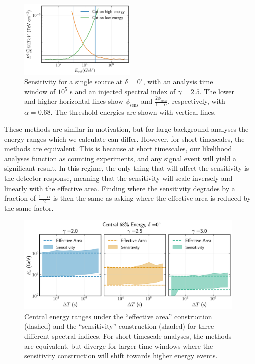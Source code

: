 \documentclass[a4paper,11pt]{article}
\begin{document}
\begin{figure}
    \centering
    \includegraphics[width=0.5\textwidth]{figures/sensitivity_en_range_gfu.png}
    \caption{Sensitivity for a single source at $\delta=0^{\circ}$, with an analysis time window of $10^5$ s and an injected spectral index of $\gamma=2.5$. The lower and higher horizontal lines show $\phi_{\mathrm{sens}}$ and  $\frac{2\phi_{\mathrm{sens}}}{1+\alpha}$, respectively, with $\alpha=0.68$. The threshold energies are shown with vertical lines.}
    \label{fig:central_en_sensitivity_gfu}
\end{figure}

These methods are similar in motivation, but for large background analyses the energy ranges which we calculate can differ. However, for short timescales, the methods are equivalent. This is because at short timescales, our likelihood analyses function as counting experiments, and any signal event will yield a significant result. In this regime, the only thing that will affect the sensitivity is the detector response, meaning that the sensitivity will scale inversely and linearly with the effective area. Finding where the sensitivity degrades by a fraction of $\frac{1-\alpha}{2}$ is then the same as asking where the effective area is reduced by the same factor.

\begin{figure}
    \centering
    \includegraphics[width=0.98\textwidth]{figures/central_en_comparison_gfu.png}
    \caption{Central energy ranges under the ``effective area'' construction (dashed) and the ``sensitivity'' construction (shaded) for three different spectral indices. For short timescale analyses, the methods are equivalent, but diverge for larger time windows where the sensitivity construction will shift towards higher energy events.}
    \label{fig:energy_range_comparison}
\end{figure}
\end{document}
